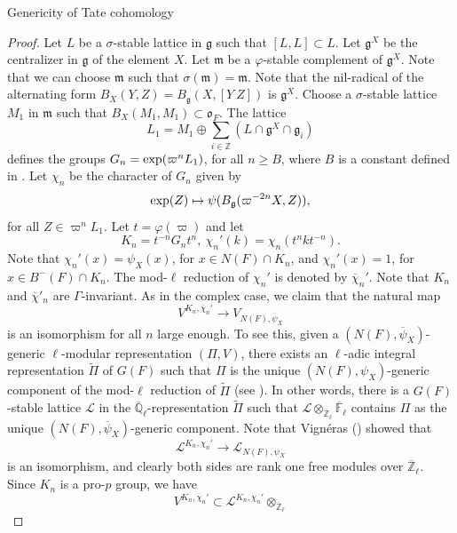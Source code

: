 \documentclass[10pt, reqno]{amsart}
\theoremstyle{plain}
\numberwithin{equation}{section}
\begin{document}
\begin{section}{Genericity of Tate cohomology}
\begin{proof}
Let $L$ be a $\sigma$-stable lattice in $\mathfrak{g}$ such 
that $[L, L]\subset L$. Let $\mathfrak{g}^X$ be the 
centralizer in $\mathfrak{g}$ of the element $X$. Let $\mathfrak{m}$ be a 
$\varphi$-stable complement of $\mathfrak{g}^X$. Note that
we can choose $\mathfrak{m}$ such that 
$\sigma(\mathfrak{m})=\mathfrak{m}$. 
Note that the nil-radical of the alternating form 
$B_X(Y, Z)=B_\mathfrak{g}(X, [Y\ Z])$
is $\mathfrak{g}^X$. Choose a $\sigma$-stable lattice 
$M_1$ in $\mathfrak{m}$ such that 
$B_X(M_1, M_1)\subset \mathfrak{o}_F$. 
The lattice 
$$L_1=M_1\oplus \sum_{i\in \mathbb{Z}}
(L\cap \mathfrak{g}^X\cap \mathfrak{g}_i)$$ defines the groups
$G_n={\rm exp}(\varpi^n L_1)$, for all $n\geq B$, where $B$ is a
constant defined in \cite[Lemma I.3]{MW_paper}. Let $\chi_n$ be the
character of $G_n$ given by
$${\rm exp}(Z)\mapsto \psi(B_\mathfrak{g}(\varpi^{-2n}X, Z)),$$
for all $Z\in \varpi^nL_1$. 
Let $t=\varphi(\varpi)$
and let 
$$K_n=t^{-n}G_nt^n,\ \chi_n'(k)=\chi_n(t^nkt^{-n}).$$
Note that $\chi_n'(x)=\psi_{X}(x)$, for $x\in N(F)\cap K_n$, and 
$\chi_n'(x)=1$, for $x\in B^-(F)\cap K_n$. 
The mod-$\ell$ reduction of $\chi_n'$ is denoted by 
$\overline{\chi}_n'$.
Note that $K_n$ and $\overline{\chi}'_n$ are $\Gamma$-invariant. As in the 
complex case, we claim 
that the natural map 
\begin{equation}\label{section}
    V^{K_n, \overline{\chi}_n'}\rightarrow V_{N(F), \overline{\psi}_X}
\end{equation}
is an isomorphism for all $n$ large enough. To see this, given a 
$(N(F), \overline{\psi}_X)$-generic $\ell$-modular representation 
$(\Pi, V)$, there exists an $\ell$-adic integral 
representation $\widetilde{\Pi}$ of $G(F)$ such that $\Pi$ is the 
unique $(N(F), \psi_X)$-generic component of the mod-$\ell$
reduction of $\widetilde{\Pi}$ 
(see \cite[Corollary 7.2]{nadir_whit_model}). In other words, there is a 
$G(F)$-stable lattice 
$\mathcal{L}$ in the $\overline{\mathbb{Q}}_\ell$-representation
$\widetilde{\Pi}$ such that 
$\mathcal{L}\otimes_{\overline{\mathbb{Z}}_\ell}\overline{\mathbb{F}}_\ell$
contains $\Pi$ as the unique $(N(F), \overline{\psi}_X)$-generic component.  
 Note that Vign\'eras (\cite[Proposition III.4.6]
{Vigneras_Highest_Whittaker_model})
showed that 
$$\mathcal{L}^{K_n, \chi_n'}\rightarrow \mathcal{L}_{N(F), \psi_X}$$
is an isomorphism, and clearly both sides are rank one free modules over 
$\overline{\mathbb{Z}}_\ell$. 
Since $K_n$ is a pro-$p$ group, we have 
$$V^{K_n, \overline{\chi}_n'}\subset \mathcal{L}^{K_n, 
\chi_n'}\otimes_{\overline{\mathbb{Z}}_\ell}
$$
\end{proof}
\end{section}
\end{document}
